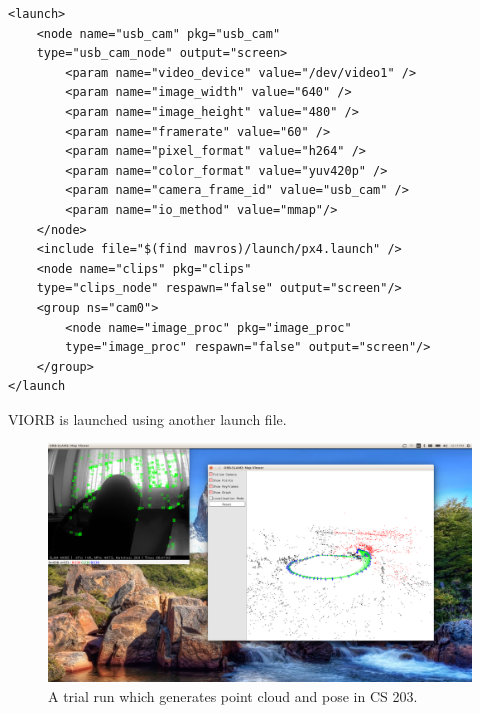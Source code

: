 \begin{lstlisting}
<launch>                                                                                                               
	<node name="usb_cam" pkg="usb_cam" 
	type="usb_cam_node" output="screen>                                             
		<param name="video_device" value="/dev/video1" />                                                                  
		<param name="image_width" value="640" />                                                                           
		<param name="image_height" value="480" />                                                                          
		<param name="framerate" value="60" />                                                                              
		<param name="pixel_format" value="h264" />                                                                         
		<param name="color_format" value="yuv420p" />                                                                      
		<param name="camera_frame_id" value="usb_cam" />                                                                   
		<param name="io_method" value="mmap"/>                                                                             
	</node>                                                                                                              
	<include file="$(find mavros)/launch/px4.launch" />                                                                  
	<node name="clips" pkg="clips" 
	type="clips_node" respawn="false" output="screen"/>                                  
	<group ns="cam0">                                                                                                    
		<node name="image_proc" pkg="image_proc"
		type="image_proc" respawn="false" output="screen"/>                       
	</group>                                                                                                             
</launch
\end{lstlisting}

VIORB is launched using another launch file.
\begin{figure}
	\centering
	\includegraphics[width=5in]{figures/cloudpoint}
	\caption[Trial run]{\small 
		 A trial run which generates point cloud and pose in CS 203. }
\end{figure}

\FloatBarrier
